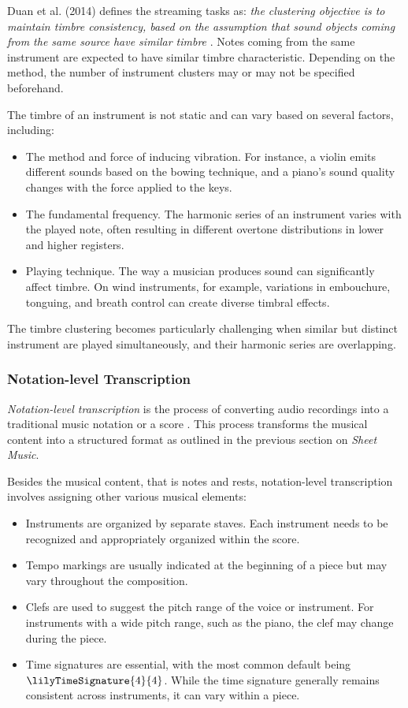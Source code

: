 Duan et al. (2014) defines the streaming tasks as: \emph{the clustering objective is to maintain timbre consistency, based on the assumption that sound objects coming from the same source have similar timbre} \cite{Duan2014}. Notes coming from the same instrument are expected to have similar timbre characteristic. Depending on the method, the number of instrument clusters may or may not be specified beforehand.

The timbre of an instrument is not static and can vary based on several factors, including:
\begin{itemize}
	\item The method and force of inducing vibration. For instance, a violin emits different sounds based on the bowing technique, and a piano's sound quality changes with the force applied to the keys.
	\item The fundamental frequency. The harmonic series of an instrument varies with the played note, often resulting in different overtone distributions in lower and higher registers.
	\item Playing technique. The way a musician produces sound can significantly affect timbre. On wind instruments, for example, variations in embouchure, tonguing, and breath control can create diverse timbral effects.
\end{itemize}

The timbre clustering becomes particularly challenging when similar but distinct instrument are played simultaneously, and their harmonic series are overlapping.

\subsubsection{Notation-level Transcription}

\emph{Notation-level transcription} is the process of converting audio recordings into a traditional music notation or a score \cite{Bhattarai2023}. This process transforms the musical content into a structured format as outlined in the previous section on \emph{Sheet Music}.

Besides the musical content, that is notes and rests, notation-level transcription involves assigning other various musical elements:
\begin{itemize}
	\item Instruments are organized by separate staves. Each instrument needs to be recognized and appropriately organized within the score.
	\item Tempo markings are usually indicated at the beginning of a piece but may vary throughout the composition.
	\item Clefs are used to suggest the pitch range of the voice or instrument. For instruments with a wide pitch range, such as the piano, the clef may change during the piece.
	\item Time signatures are essential, with the most common default being $\lilyTimeSignature{4}{4}$. While the time signature generally remains consistent across instruments, it can vary within a piece.
\end{itemize}

